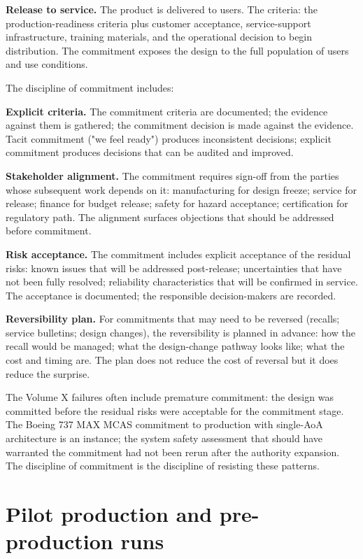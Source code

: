 \textbf{Release to service.} The product is delivered to users. The criteria: the production-readiness criteria plus customer acceptance, service-support infrastructure, training materials, and the operational decision to begin distribution. The commitment exposes the design to the full population of users and use conditions.

The discipline of commitment includes:

\textbf{Explicit criteria.} The commitment criteria are documented; the evidence against them is gathered; the commitment decision is made against the evidence. Tacit commitment ("we feel ready") produces inconsistent decisions; explicit commitment produces decisions that can be audited and improved.

\textbf{Stakeholder alignment.} The commitment requires sign-off from the parties whose subsequent work depends on it: manufacturing for design freeze; service for release; finance for budget release; safety for hazard acceptance; certification for regulatory path. The alignment surfaces objections that should be addressed before commitment.

\textbf{Risk acceptance.} The commitment includes explicit acceptance of the residual risks: known issues that will be addressed post-release; uncertainties that have not been fully resolved; reliability characteristics that will be confirmed in service. The acceptance is documented; the responsible decision-makers are recorded.

\textbf{Reversibility plan.} For commitments that may need to be reversed (recalls; service bulletins; design changes), the reversibility is planned in advance: how the recall would be managed; what the design-change pathway looks like; what the cost and timing are. The plan does not reduce the cost of reversal but it does reduce the surprise.

The Volume X failures often include premature commitment: the design was committed before the residual risks were acceptable for the commitment stage. The Boeing 737 MAX MCAS commitment to production with single-AoA architecture is an instance; the system safety assessment that should have warranted the commitment had not been rerun after the authority expansion. The discipline of commitment is the discipline of resisting these patterns.

\section{Pilot production and pre-production runs}

